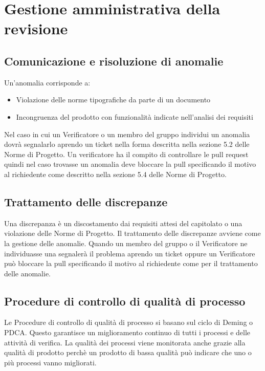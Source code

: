 \section{Gestione amministrativa della revisione}
\subsection{Comunicazione e risoluzione di anomalie}
Un'anomalia corrisponde a:
\begin{itemize}
	\item Violazione delle norme tipografiche da parte di un documento
	\item Incongruenza del prodotto con funzionalità indicate nell'analisi dei requisiti
\end{itemize}
Nel caso in cui un Verificatore o un membro del gruppo individui un anomalia dovrà segnalarlo aprendo un ticket nella forma descritta nella sezione 5.2 delle Norme di Progetto. Un verificatore ha il compito di controllare le pull request quindi nel caso trovasse un anomalia deve bloccare la pull specificando il motivo al richiedente come descritto nella sezione 5.4 delle Norme di Progetto.
\subsection{Trattamento delle discrepanze}
Una discrepanza è un discostamento dai requisiti attesi del capitolato o una violazione delle Norme di Progetto.
Il trattamento delle discrepanze avviene come la gestione delle anomalie. Quando un membro del gruppo o il Verificatore ne individuasse una segnalerà il problema aprendo un ticket oppure un Verificatore può bloccare la pull specificando il motivo al richiedente come per il trattamento delle anomalie.
\subsection{Procedure di controllo di qualità di processo}
Le Procedure di controllo di qualità di processo si basano sul ciclo di Deming o PDCA. Questo garantisce un miglioramento continuo di tutti i processi e delle attività di verifica.
La qualità dei processi viene monitorata anche grazie alla qualità di prodotto perchè un prodotto di bassa qualità può indicare che uno o più processi vanno migliorati.
